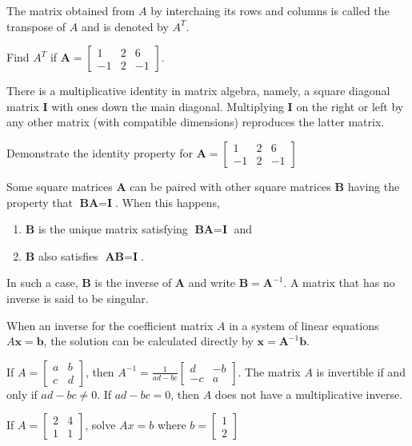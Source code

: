 \documentclass[../diffeq.tex]{subfiles}
\begin{document}
The matrix obtained from $A$ by interchaing its rows and columns is called the transpose of $A$ and is denoted by $A^T$.

\ex Find $A^T$ if $\textbf{A}=\begin{bmatrix}
    1 & 2 & 6\\
    -1 & 2 & -1
\end{bmatrix}$.

There is a multiplicative identity in matrix algebra, namely, a square diagonal matrix $\textbf{I}$ with ones down the main diagonal. Multiplying $\textbf{I}$ on the right or left by any other matrix 
(with compatible dimensions) reproduces the latter matrix.

\ex Demonstrate the identity property for $\textbf{A}=\begin{bmatrix}
    1&2&6\\
    -1&2&-1
\end{bmatrix}$

Some square matrices $\textbf{A}$ can be paired with other square matrices $\textbf{B}$ having the property that $\textbf{B}\textbf{A}=\textbf{I}$. When this happens,
\begin{enumerate}
    \item $\textbf{B}$ is the unique matrix satisfying $\textbf{BA}=\textbf{I}$ and 
    \item $\textbf{B}$ also satisfies $\textbf{AB}=\textbf{I}$.
\end{enumerate}
In such a case, $\textbf{B}$ is the inverse of $\textbf{A}$ and write $\textbf{B}=\textbf{A}^{-1}$. A matrix that has no inverse is said to be singular.

When an inverse for the coefficient matrix $A$ in a system of linear equations $A\textbf{x}=\textbf{b}$, the solution can be calculated directly by $\textbf{x}=\textbf{A}^{-1}\textbf{b}$.

If $A=\begin{bmatrix}
    a & b\\
    c & d
\end{bmatrix}$, then $A^{-1}=\frac{1}{ad-bc}\begin{bmatrix}
    d & -b\\
    -c & a
\end{bmatrix}$.
The matrix $A$ is invertible if and only if $ad-bc\neq 0$. If $ad-bc=0$, then $A$ does not have a multiplicative inverse.

\ex If $A=\begin{bmatrix}
    2&4\\1&1
\end{bmatrix}$, solve $Ax=b$ where $b=\begin{bmatrix}
    1\\2
\end{bmatrix}$
\end{document}

